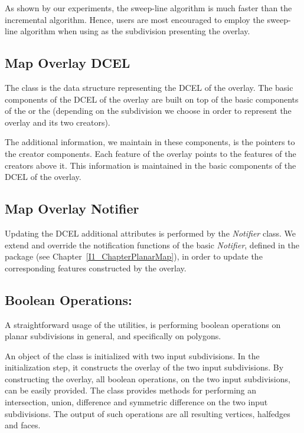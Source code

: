 \begin{ccTexOnly}
As shown by our experiments, the sweep-line algorithm is much faster than the incremental 
algorithm. Hence, users are most encouraged to employ the sweep-line algorithm 
when using  as the subdivision presenting the overlay. 

\subsection*{Map Overlay DCEL}
The 
class is the data structure representing the DCEL of the overlay. 
The basic components of the DCEL of the overlay are built 
on top of the basic components of the  or 
the  
(depending on the subdivision we choose in order to represent the overlay and its 
two creators).

The additional information, we maintain in these components, is the pointers 
to the creator components.
Each feature of the overlay points to the features of the creators above it.
This information is maintained in the basic components of the DCEL of the overlay.

\subsection*{Map Overlay Notifier}
Updating the DCEL additional attributes is performed by the {\em Notifier} class.
We extend and override the notification functions of the basic {\em Notifier}, defined 
in the  package (see Chapter~\ref{I1_ChapterPlanarMap}), 
in order to update the corresponding features constructed by the overlay.  

\subsection*{Boolean Operations:}
A straightforward usage of the  
utilities, is performing boolean operations on planar subdivisions in general, 
and specifically on polygons.

An object of the  
class is initialized with two input subdivisions. 
In the initialization step, it constructs the overlay 
of the two input subdivisions. 
By constructing the overlay, all boolean operations, 
on the two input subdivisions, can be easily provided.
The  
class provides methods for performing an intersection, union, 
difference and symmetric difference on the two input subdivisions. 
The output of such operations are all resulting vertices, 
halfedges and faces.


\end{ccTexOnly}
